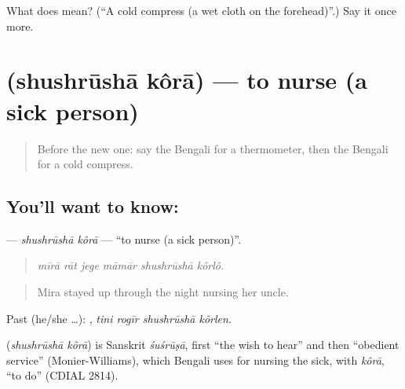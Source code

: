 \begin{tcolorbox}[breakable,colback=teal!4,colframe=teal!35!black,title={Before you move on}]
What does  mean? (\textquotedblleft{}A cold compress (a wet cloth on the forehead)\textquotedblright{}.) Say it once more.
\end{tcolorbox}
\section[\texorpdfstring{\bn{শুশ্রূষা} \bn{করা} (shushrūshā kôrā)}{শুশ্রূষা করা (shushrūshā kôrā)}]{  (shushrūshā kôrā) — to nurse (a sick person)}

\label{lesson:BN-C478-shushrusha-kora}



\begin{quote}
Before the new one: say the Bengali for a thermometer, then the Bengali for a cold compress.
\end{quote}

\subsection*{You'll want to know:  }
\textbf{ } — \emph{shushrūshā kôrā} — \textquotedblleft{}to nurse (a sick person)\textquotedblright{}.

\begin{quote}
     
\end{quote}

\begin{quote}
\emph{mīrā rāt jege māmār shushrūshā kôrlô.}
\end{quote}

\begin{quote}
Mira stayed up through the night nursing her uncle.
\end{quote}

Past (he/she …):    , \emph{tini rogīr shushrūshā kôrlen}.

\begin{cousinweb}
\textbf{ } (\emph{shushrūshā kôrā}) is Sanskrit \emph{śuśrūṣā}, first \textquotedblleft{}the wish to hear\textquotedblright{} and then \textquotedblleft{}obedient service\textquotedblright{} (Monier-Williams), which Bengali uses for nursing the sick, with \emph{kôrā}, \textquotedblleft{}to do\textquotedblright{} (CDIAL 2814).
\end{cousinweb}

